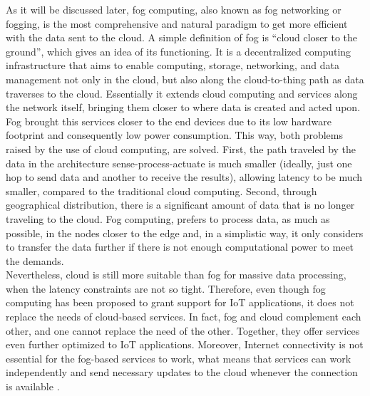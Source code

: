 \noindent\tab As it will be discussed later, fog computing, also known as fog networking or fogging, is the most comprehensive and natural paradigm to get more efficient with the data sent to the cloud. A simple definition of fog is ``cloud closer to the ground'', which gives an idea of its functioning. It is a decentralized computing infrastructure that aims to enable computing, storage, networking, and data management not only in the cloud, but also along the cloud-to-thing path as data traverses to the cloud. Essentially it extends cloud computing and services along the network itself, bringing them closer to where data is created and acted upon. Fog brought this services closer to the end devices due to its low hardware footprint and consequently low power consumption. This way, both problems raised by the use of cloud computing, are solved. First, the path traveled by the data in the architecture sense-process-actuate is much smaller (ideally, just one hop to send data and another to receive the results), allowing latency to be much smaller, compared to the traditional cloud computing. Second, through geographical distribution, there is a significant amount of data that is no longer traveling to the cloud. Fog computing, prefers to process data, as much as possible, in the nodes closer to the edge and, in a simplistic way, it only considers to transfer the data further if there is not enough computational power to meet the demands.\\
\noindent\tab Nevertheless, cloud is still more suitable than fog for massive data processing, when the latency constraints are not so tight. Therefore, even though fog computing has been proposed to grant support for IoT applications, it does not replace the needs of cloud-based services. In fact, fog and cloud complement each other, and one cannot replace the need of the other. Together, they offer services even further optimized to IoT applications. Moreover, Internet connectivity is not essential for the fog-based services to work, what means that services can work independently and send necessary updates to the cloud whenever the connection is available \cite{yousefpour2018all}.\\
